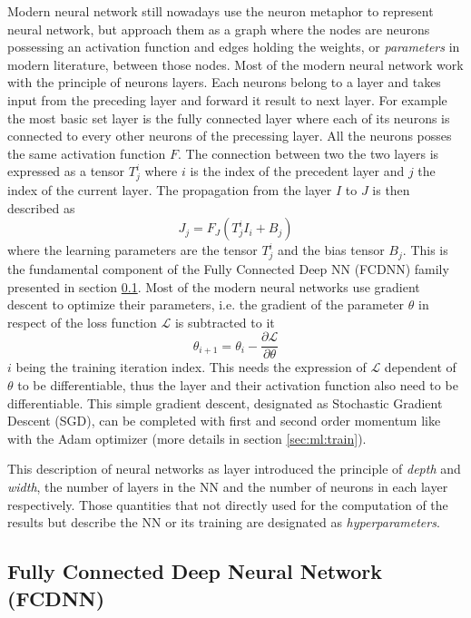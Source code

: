 \documentclass[../main.tex]{subfiles}
\begin{document}
Modern neural network still nowadays use the neuron metaphor to represent neural network, but approach them as a graph where the nodes are neurons possessing an activation function and edges holding the weights, or \textit{parameters} in modern literature, between those nodes. Most of the modern neural network work with the principle of neurons layers. Each neurons belong to a layer and takes input from the preceding layer and forward it result to next layer. For example the most basic set layer is the fully connected layer where each of its neurons is connected to every other neurons of the precessing layer. All the neurons posses the same activation function $F$. The connection between two the two layers is expressed as a tensor $T^{i}_{j}$ where $i$ is the index of the precedent layer and $j$ the index of the current layer. The propagation from the layer $I$ to $J$ is then described as
\begin{equation}
  \label{eq:ml:fully-connected}
  J_{j} = F_J(T_{j}^{i} I_{i} + B_j)
\end{equation}
where the learning parameters are the tensor $T_j^i$ and the bias tensor $B_j$. This is the fundamental component of the Fully Connected Deep NN (FCDNN) family presented in section \ref{sec:ml:fcdnn}. Most of the modern neural networks use gradient descent to optimize their parameters, i.e. the gradient of the parameter $\theta$ in respect of the loss function $\mathcal{L}$ is subtracted to it
\begin{equation}
  \theta_{i+1} = \theta_i - \frac{\partial \mathcal{L}}{\partial \theta}
\end{equation}
$i$ being the training iteration index. This needs the expression of $\mathcal{L}$ dependent of $\theta$ to be differentiable, thus the layer and their activation function also need to be differentiable. This simple gradient descent, designated as Stochastic Gradient Descent (SGD), can be completed with first and second order momentum like with the Adam optimizer \cite{kingma_adam_2017} (more details in section \ref{sec:ml:train}).

This description of neural networks as layer introduced the principle of \textit{depth} and \textit{width}, the number of layers in the NN and the number of neurons in each layer respectively. Those quantities that not directly used for the computation of the results but describe the NN or its training are designated as \textit{hyperparameters}.

\subsection{Fully Connected Deep Neural Network (FCDNN)}
\label{sec:ml:fcdnn}
\end{document}
